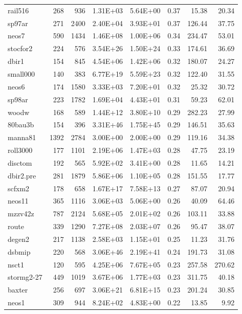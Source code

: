 \documentclass[10pt]{article}
\begin{document}
\begin{longtable}{|l|r|r|r|r|r|r|r|}
rail516	&	268	&	936	&	1.31E+03	&	5.64E+00	&	0.37	&	15.38	&	20.34	\\
sp97ar	&	271	&	2400	&	2.40E+04	&	3.93E+01	&	0.37	&	126.44	&	37.75	\\
neos7	&	590	&	1434	&	1.46E+08	&	1.00E+06	&	0.34	&	234.47	&	53.01	\\
stocfor2	&	224	&	576	&	3.54E+26	&	1.50E+24	&	0.33	&	174.61	&	36.69	\\
dbir1	&	154	&	845	&	4.54E+06	&	1.42E+06	&	0.32	&	180.07	&	24.27	\\
small000	&	140	&	383	&	6.77E+19	&	5.59E+23	&	0.32	&	122.40	&	31.55	\\
neos6	&	174	&	1580	&	3.33E+03	&	7.20E+01	&	0.32	&	25.32	&	30.72	\\
sp98ar	&	223	&	1782	&	1.69E+04	&	4.43E+01	&	0.31	&	59.23	&	62.01	\\
woodw	&	168	&	589	&	1.44E+12	&	3.80E+10	&	0.29	&	282.23	&	27.99	\\
80bau3b	&	154	&	396	&	3.31E+46	&	1.75E+45	&	0.29	&	146.51	&	35.63	\\
manna81	&	1392	&	2784	&	3.00E+00	&	2.00E+00	&	0.29	&	119.16	&	34.38	\\
roll3000	&	177	&	1101	&	2.19E+06	&	1.47E+03	&	0.28	&	47.75	&	23.19	\\
disctom	&	192	&	565	&	5.92E+02	&	3.41E+00	&	0.28	&	11.65	&	14.21	\\
dbir2.pre	&	281	&	1879	&	5.86E+06	&	1.10E+05	&	0.28	&	151.55	&	17.77	\\
scfxm2	&	178	&	658	&	1.67E+17	&	7.58E+13	&	0.27	&	87.07	&	20.94	\\
neos11	&	365	&	1116	&	3.06E+03	&	5.06E+00	&	0.26	&	40.09	&	64.46	\\
mzzv42z	&	787	&	2124	&	5.68E+05	&	2.01E+02	&	0.26	&	103.11	&	33.88	\\
route	&	339	&	1290	&	7.27E+08	&	2.03E+07	&	0.26	&	95.47	&	38.07	\\
degen2	&	217	&	1138	&	2.58E+03	&	1.15E+01	&	0.25	&	11.23	&	31.76	\\
dsbmip	&	220	&	568	&	3.06E+46	&	2.19E+41	&	0.24	&	191.73	&	31.08	\\
nsct1	&	120	&	595	&	4.25E+06	&	7.67E+05	&	0.23	&	257.58	&	270.62	\\
stormg2-27	&	449	&	1019	&	3.67E+06	&	1.77E+03	&	0.23	&	311.75	&	40.18	\\
baxter	&	256	&	697	&	3.06E+21	&	6.81E+15	&	0.23	&	201.24	&	30.85	\\
neos1	&	309	&	944	&	8.24E+02	&	4.83E+00	&	0.22	&	13.85	&	9.92	\\

\end{longtable}
\end{document}
